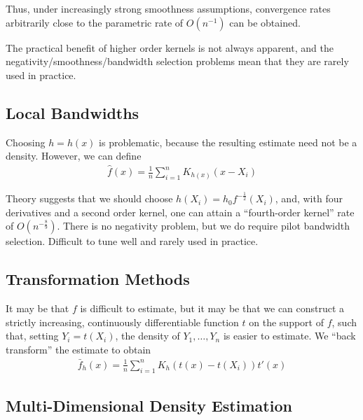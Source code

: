 Thus, under increasingly strong smoothness assumptions, convergence
rates arbitrarily close to the parametric rate of $O(n^{-1})$ can be
obtained.

The practical benefit of higher order kernels is not always apparent,
and the negativity/smoothness/bandwidth selection problems mean that
they are rarely used in practice.

\subsection{Local Bandwidths}
\label{sec:local-bandwidths}

Choosing $h = h(x)$  is problematic, because the resulting estimate
need not be a density.  However, we can define
\begin{align}
  \label{eq:45}
  \hat f(x) = \frac{1}{n} \sum_{i=1}^{n} K_{h(x)}(x - X_{i})
\end{align}

Theory suggests that we should choose $h(X_{i}) = h_{0}
f^{-\frac{1}{2}}(X_{i})$, and, with four derivatives and a second
order kernel, one can attain a ``fourth-order kernel'' rate of
$O(n^{-\frac{8}{9}})$.  There is no negativity problem, but we do
require pilot bandwidth selection.  Difficult to tune well and rarely
used in practice.

\subsection{Transformation Methods}
\label{sec:transf-meth}

It may be that $f$ is difficult to estimate, but it may be that we
can construct a strictly increasing, continuously differentiable
function $t$ on the support of $f$, such that, setting $Y_{i} =
t(X_{i})$, the density of $Y_{1}, \dots, Y_{n}$ is easier to estimate.
We ``back transform'' the estimate to obtain
\begin{align}
  \label{eq:46}
  \bar f_{h}(x) = \frac{1}{n} \sum_{i=1}^{n} K_{h}(t(x) - t(X_{i})) t'(x)
\end{align}

\subsection{Multi-Dimensional Density Estimation}
\label{sec:multi-dimens-dens}

